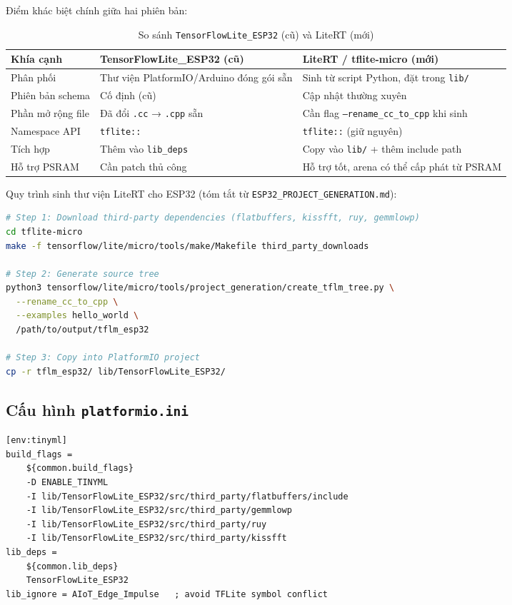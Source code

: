 \documentclass[12pt,a4paper]{article}
\begin{document}
Điểm khác biệt chính giữa hai phiên bản:

\begin{table}[H]
\centering
\caption{So sánh \texttt{TensorFlowLite\_ESP32} (cũ) và LiteRT (mới)}
\begin{tabularx}{\linewidth}{@{}l X X@{}}
\toprule
\textbf{Khía cạnh} & \textbf{TensorFlowLite\_ESP32 (cũ)} & \textbf{LiteRT / tflite-micro (mới)} \\
\midrule
Phân phối & Thư viện PlatformIO/Arduino đóng gói sẵn & Sinh từ script Python, đặt trong \texttt{lib/} \\
Phiên bản schema & Cố định (cũ) & Cập nhật thường xuyên \\
Phần mở rộng file & Đã đổi \texttt{.cc} → \texttt{.cpp} sẵn & Cần flag \texttt{--rename\_cc\_to\_cpp} khi sinh \\
Namespace API & \texttt{tflite::} & \texttt{tflite::} (giữ nguyên) \\
Tích hợp & Thêm vào \texttt{lib\_deps} & Copy vào \texttt{lib/} + thêm include path \\
Hỗ trợ PSRAM & Cần patch thủ công & Hỗ trợ tốt, arena có thể cấp phát từ PSRAM \\
\bottomrule
\end{tabularx}
\end{table}

Quy trình sinh thư viện LiteRT cho ESP32 (tóm tắt từ \texttt{ESP32\_PROJECT\_GENERATION.md}):

\begin{lstlisting}[language=bash, caption={Sinh cây thư mục LiteRT cho ESP32}]
# Step 1: Download third-party dependencies (flatbuffers, kissfft, ruy, gemmlowp)
cd tflite-micro
make -f tensorflow/lite/micro/tools/make/Makefile third_party_downloads

# Step 2: Generate source tree
python3 tensorflow/lite/micro/tools/project_generation/create_tflm_tree.py \
  --rename_cc_to_cpp \
  --examples hello_world \
  /path/to/output/tflm_esp32

# Step 3: Copy into PlatformIO project
cp -r tflm_esp32/ lib/TensorFlowLite_ESP32/
\end{lstlisting}

\subsection{Cấu hình \texttt{platformio.ini}}

\begin{lstlisting}[caption={Cấu hình PlatformIO cho back-end TFLite Micro}]
[env:tinyml]
build_flags =
    ${common.build_flags}
    -D ENABLE_TINYML
    -I lib/TensorFlowLite_ESP32/src/third_party/flatbuffers/include
    -I lib/TensorFlowLite_ESP32/src/third_party/gemmlowp
    -I lib/TensorFlowLite_ESP32/src/third_party/ruy
    -I lib/TensorFlowLite_ESP32/src/third_party/kissfft
lib_deps =
    ${common.lib_deps}
    TensorFlowLite_ESP32
lib_ignore = AIoT_Edge_Impulse   ; avoid TFLite symbol conflict
\end{lstlisting}
\end{document}

